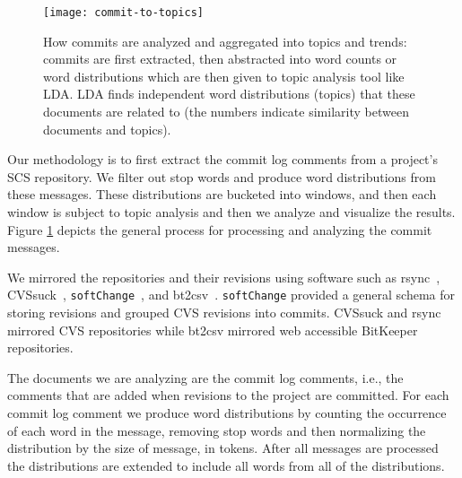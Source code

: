 \documentclass[times, 10pt,twocolumn]{article}
\newcommand{\shrinkit}{\vspace*{-.3em}}
\begin{document}
\shrinkit
{}
\shrinkit



\begin{figure}[t]
  \centering
  \texttt{[image: commit-to-topics]} 
  \caption{How commits are analyzed and aggregated into topics and trends: commits are first extracted, then abstracted into word counts or word distributions which are then given to topic analysis tool like LDA. LDA finds independent word distributions (topics) that these documents are related to (the numbers indicate similarity between documents and topics).}
  \label{fig:commits}
\end{figure}



Our methodology is to first extract the commit log comments from a
project's SCS repository. We filter out stop words and produce word
distributions from these messages. These distributions are bucketed
into windows, and then each window is subject to topic analysis and
then we analyze and visualize the results. Figure \ref{fig:commits}
depicts the general process for processing and analyzing the commit
messages.




\shrinkit
{}
\shrinkit


We mirrored the repositories and their revisions using software such
as rsync~\cite{rsync}, CVSsuck~\cite{cvssuck},
\texttt{softChange}~\cite{dmgseke2004short}, and bt2csv~\cite{methodology-short}.
\texttt{softChange} provided a general schema for storing revisions
and grouped CVS revisions into commits. CVSsuck and rsync mirrored CVS
repositories while bt2csv mirrored web accessible BitKeeper
repositories.


The documents we are analyzing are the commit log comments, i.e., the
comments that are added when revisions to the project are committed.
% 
%
For each commit log comment we produce word distributions by counting
the occurrence of each word in the message, removing stop words and
then normalizing the distribution by the size of message, in tokens.
After
all messages are processed the distributions are extended to include
all words from all of the distributions.
\end{document}
